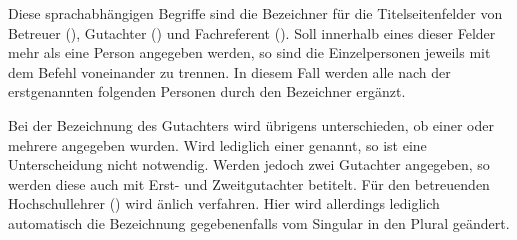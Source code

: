 \begin{Declaration}{}
\begin{Declaration}{}
\begin{Declaration}{}
\begin{Declaration}{}
\begin{Declaration}{}
\begin{Declaration}{}
\begin{Declaration}{}
\begin{Declaration}[v2.02]{}
\printdeclarationlist%
%
%
%
%
Diese sprachabhängigen Begriffe sind die Bezeichner für die Titelseitenfelder 
von Betreuer (), Gutachter () und Fachreferent 
(). Soll innerhalb eines dieser Felder mehr als eine Person 
angegeben werden, so sind die Einzelpersonen jeweils mit dem Befehl  
voneinander zu trennen. In diesem Fall werden alle nach der erstgenannten 
folgenden Personen durch den Bezeichner  ergänzt.

Bei der Bezeichnung des Gutachters wird übrigens unterschieden, ob einer oder 
mehrere angegeben wurden. Wird lediglich einer genannt, so ist eine 
Unterscheidung nicht notwendig. Werden jedoch zwei Gutachter angegeben, so 
werden diese auch mit Erst- und Zweitgutachter betitelt. Für den betreuenden 
Hochschullehrer () wird änlich verfahren. Hier wird allerdings 
lediglich automatisch die Bezeichnung gegebenenfalls vom Singular in den Plural 
geändert.

\end{Declaration}
\end{Declaration}
\end{Declaration}
\end{Declaration}
\end{Declaration}
\end{Declaration}
\end{Declaration}
\end{Declaration}

